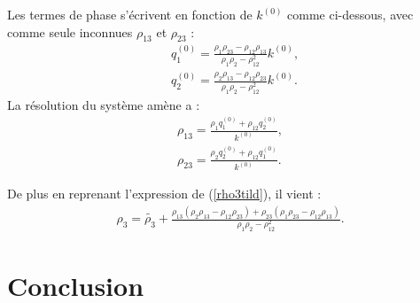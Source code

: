 \documentclass[12pt]{report}
\begin{document}
    Les termes de phase s'écrivent en fonction de $k^{(0)}$ comme ci-dessous, avec comme seule inconnues $\rho_{13}$ et $\rho_{23}$ :
\begin{align*}
&q_1^{(0)}=\frac{\rho_1\rho_{23}-\rho_{12}\rho_{13}}{\rho_1\rho_2-\rho_{12}^2}k^{(0)},\\
&q_2^{(0)}=\frac{\rho_2\rho_{13}-\rho_{12}\rho_{23}}{\rho_1\rho_2-\rho_{12}^2}k^{(0)}.
\end{align*}
La résolution du système amène a :
\begin{align*}
\rho_{13}=\frac{\rho_1q_1^{(0)}+\rho_{12}q_2^{(0)}}{k^{(0)}},\\
\rho_{23}=\frac{\rho_2q_2^{(0)}+\rho_{12}q_1^{(0)}}{k^{(0)}}.
\end{align*}

De plus en reprenant l'expression de (\ref{rho3tild}), il vient :
\begin{align*}
\rho_3=\tilde{\rho_3}+\frac{\rho_{13}(\rho_2\rho_{13}-\rho_{12}\rho_{23})+\rho_{23}(\rho_1\rho_{23}-\rho_{12}\rho_{13})}{\rho_1\rho_2-\rho_{12}^2}.
\end{align*}
    
\chapter*{Conclusion}
\end{document}
